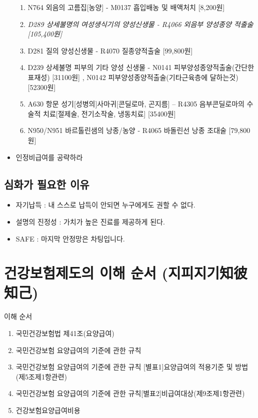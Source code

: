 \begin{itemize}
	\begin{enumerate}\tightlist
	\item N764 외음의 고름집[농양]   - M0137 흡입배농 및 배액처치 [8,200원]
	\item \emph{D289 상세불명의 여성생식기의 양성신생물 - R4066 외음부 양성종양 적출술[105,400원]}
	\item D281 질의 양성신생물 - R4070 질종양적출술 [99,800원]
	\item D239 상세불명 피부의 기타 양성 신생물 -    N0141 피부양성종양적출술(간단한표재성) [31100원] ,   N0142  피부양성종양적출술(기타근육층에 달하는것) [52300원]
	\item A630 항문 성기[성병의]사마귀[콘딜로마, 곤지름] –    R4305 음부콘딜로마의 수술적 치료[절제술, 전기소작술, 냉동치료] 
   [35400원]
	\item N950/N951 바르톨린샘의 낭종/농양 - R4065 바돌린선 낭종 조대술 [79,800원]
	\end{enumerate}
\item 인정비급여를 공략하라	
\end{itemize}

\subsection{심화가 필요한 이유}
\begin{itemize}\tightlist
\item 자기납득 : 내 스스로 납득이 안되면 누구에게도 권할 수 없다.
\item 설명의 진정성 : 가치가 높은 진료를 제공하게 된다.
\item SAFE : 마지막 안정망은 차팅입니다.
\end{itemize}
\clearpage

\section{건강보험제도의 이해 순서 (지피지기知彼知己)}
이해 순서
\begin{enumerate}[1)]\tightlist
\item 국민건강보험법 제41조(요양급여)
\item 국민건강보험 요양급여의 기준에 관한 규칙 
\item 국민건강보험 요양급여의 기준에 관한 규칙 [별표1]요양급여의 적용기준 및 방법(제5조제1항관련)
\item 국민건강보험 요양급여의 기준에 관한 규칙[별표2]비급여대상(제9조제1항관련)
\item 건강보험요양급여비용
\end{enumerate}

